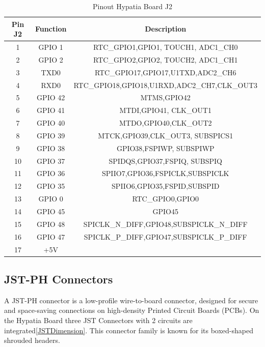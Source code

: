 	\begin{table}[!h]
	\begin{center}
		\caption[Pinout Hypatia Board J2]{Pinout Hypatia Board J2 \cite[see][8]{SYDE:2024}}
		\label{PinoutHypatiaJ1}
	\begin{tabular}{|c|c|c|}
	\hline
	\textbf{Pin J2} &\textbf{Function} & \textbf{Description} \\
	\hline
	1& GPIO 1 & RTC\_GPIO1,GPIO1, TOUCH1, ADC1\_CH0 \\
	\hline
	2& GPIO 2 & RTC\_GPIO2,GPIO2, TOUCH2, ADC1\_CH1 \\
	\hline
	3& TXD0 & RTC\_GPIO17,GPIO17,U1TXD,ADC2\_CH6 \\
	\hline
	4& RXD0  & RTC\_GPIO18,GPIO18,U1RXD,ADC2\_CH7,CLK\_OUT3 \\
	\hline
	5& GPIO 42 & MTMS,GPIO42 \\
	\hline
	6& GPIO 41 & MTDI,GPIO41, CLK\_OUT1 \\
	\hline
	7& GPIO 40 & MTDO,GPIO40,CLK\_OUT2 \\
	\hline
	8& GPIO 39 & MTCK,GPIO39,CLK\_OUT3, SUBSPICS1 \\
	\hline
	9& GPIO 38 & GPIO38,FSPIWP, SUBSPIWP \\
	\hline
	10& GPIO 37 & SPIDQS,GPIO37,FSPIQ, SUBSPIQ \\
	\hline
	11& GPIO 36 & SPIIO7,GPIO36,FSPICLK,SUBSPICLK \\
	\hline
	12& GPIO 35 & SPIIO6,GPIO35,FSPID,SUBSPID \\
	\hline
	13& GPIO 0 & RTC\_GPIO0,GPIO0 \\
	\hline
	14& GPIO 45 & GPIO45 \\
	\hline
	15& GPIO 48 & SPICLK\_N\_DIFF,GPIO48,SUBSPICLK\_N\_DIFF \\
	\hline
	16& GPIO 47 & SPICLK\_P\_DIFF,GPIO47,SUBSPICLK\_P\_DIFF \\
	\hline
	17& +5V &  \\
	\hline
\end{tabular}
\end{center}
\end{table}

\subsection{JST-PH Connectors}
A JST-PH connector is a low-profile wire-to-board connector, designed for secure and space-saving connections on high-density Printed Circuit Boards (PCBs). On the Hypatia Board three JST Connectors with 2 circuits are integrated\ref{JSTDimension}. This connector family is known for its boxed-shaped shrouded headers\cite[see][1]{JST:2024}.

